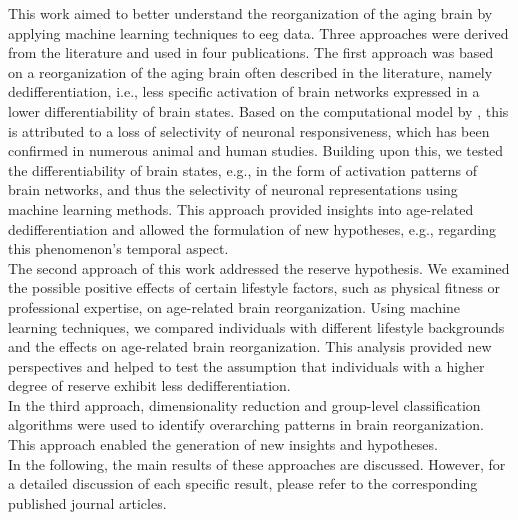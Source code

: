 This work aimed to better understand the reorganization of the aging brain by applying machine learning techniques to \gls{eeg} data. Three approaches were derived from the literature and used in four publications.
The first approach was based on a reorganization of the aging brain often described in the literature, namely dedifferentiation, i.e., less specific activation of brain networks expressed in a lower differentiability of brain states. Based on the computational model by \citeauthor{Li2001} \cite{Li2001, Li2000}, this is attributed to a loss of selectivity of neuronal responsiveness, which has been confirmed in numerous animal and human studies. Building upon this, we tested the differentiability of brain states, e.g., in the form of activation patterns of brain networks, and thus the selectivity of neuronal representations using machine learning methods. This approach provided insights into age-related dedifferentiation and allowed the formulation of new hypotheses, e.g., regarding this phenomenon's temporal aspect.\\
The second approach of this work addressed the reserve hypothesis. We examined the possible positive effects of certain lifestyle factors, such as physical fitness or professional expertise, on age-related brain reorganization. Using machine learning techniques, we compared individuals with different lifestyle backgrounds and the effects on age-related brain reorganization. This analysis provided new perspectives and helped to test the assumption that individuals with a higher degree of reserve exhibit less dedifferentiation.\\
In the third approach, dimensionality reduction and group-level classification algorithms were used to identify overarching patterns in brain reorganization. This approach enabled the generation of new insights and hypotheses.\\
In the following, the main results of these approaches are discussed. However, for a detailed discussion of each specific result, please refer to the corresponding published journal articles.\\

